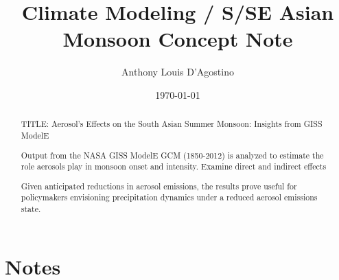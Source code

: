 \documentclass[11pt,reqno]{amsart}
\title{Climate Modeling / S/SE Asian Monsoon Concept Note}
\date{\today}
\author{Anthony Louis D'Agostino}
\begin{document}
\maketitle


\begin{abstract}
TITLE: Aerosol's Effects on the South Asian Summer Monsoon: Insights from GISS ModelE 

Output from the NASA GISS ModelE GCM (1850-2012) is analyzed to estimate the role aerosols play in monsoon onset and intensity.    Examine direct and indirect effects 

 Given anticipated reductions in aerosol emissions, the results prove useful for policymakers envisioning precipitation dynamics under a reduced aerosol emissions state.  

\end{abstract}


\section{Notes}
\end{document}
